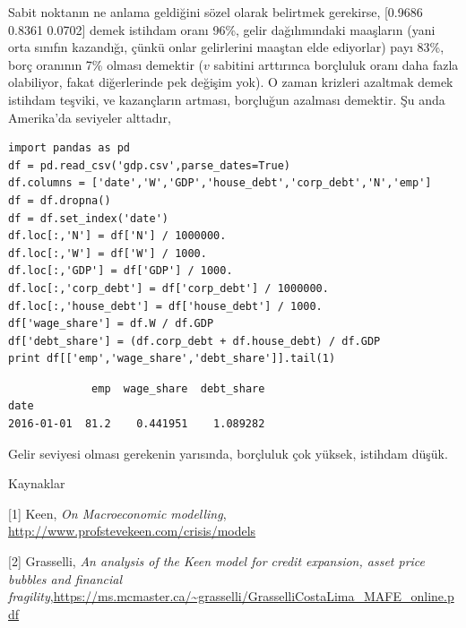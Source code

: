 \documentclass[12pt,fleqn]{article}\usepackage{../../common}
\begin{document}
Sabit noktanın ne anlama geldiğini sözel olarak belirtmek gerekirse,
[0.9686 0.8361 0.0702] demek istihdam oranı 96\%, gelir dağılımındaki
maaşların (yani orta sınıfın kazandığı, çünkü onlar gelirlerini maaştan
elde ediyorlar) payı 83\%, borç oranının 7\% olması demektir ($v$ sabitini
arttırınca borçluluk oranı daha fazla olabiliyor, fakat diğerlerinde pek
değişim yok). O zaman krizleri azaltmak demek istihdam teşviki, ve
kazançların artması, borçluğun azalması demektir. Şu anda Amerika'da
seviyeler alttadır,

\begin{verbatim}
import pandas as pd
df = pd.read_csv('gdp.csv',parse_dates=True)
df.columns = ['date','W','GDP','house_debt','corp_debt','N','emp']
df = df.dropna()
df = df.set_index('date')
df.loc[:,'N'] = df['N'] / 1000000.
df.loc[:,'W'] = df['W'] / 1000.
df.loc[:,'GDP'] = df['GDP'] / 1000.
df.loc[:,'corp_debt'] = df['corp_debt'] / 1000000.
df.loc[:,'house_debt'] = df['house_debt'] / 1000.
df['wage_share'] = df.W / df.GDP
df['debt_share'] = (df.corp_debt + df.house_debt) / df.GDP
print df[['emp','wage_share','debt_share']].tail(1)
\end{verbatim}

\begin{verbatim}
             emp  wage_share  debt_share
date                                    
2016-01-01  81.2    0.441951    1.089282
\end{verbatim}

Gelir seviyesi olması gerekenin yarısında, borçluluk çok yüksek, istihdam
düşük. 

Kaynaklar

[1] Keen, {\em On Macroeconomic modelling}, \url{http://www.profstevekeen.com/crisis/models}

[2] Grasselli, {\em An analysis of the Keen model for credit expansion, asset price bubbles and financial fragility},\url{https://ms.mcmaster.ca/~grasselli/GrasselliCostaLima_MAFE_online.pdf}
\end{document}
